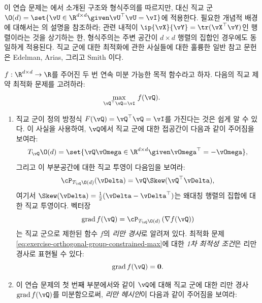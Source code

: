 \documentclass[../../book-main_ko.tex]{subfiles}
\begin{document}
\begin{exercise}\label{exercise:orthogonal-group-calculus}
    이 연습 문제는 에서 소개된 구조와 형식주의를 따르지만, 대신 직교 군 $\O(d) = \set{\vU \in \R^{d \times d} \given \vU^\top \vU = \vI}$에 적용한다. 필요한 개념적 배경에 대해서는 의 설명을 참조하라; 관련 내적이 $\ip{\vX}{\vY} = \tr(\vX^\top \vY)$인 행렬이라는 것을 상기하는 한, 형식주의는 주변 공간이 $d \times d$ 행렬의 집합인 경우에도 동일하게 적용된다. 직교 군에 대한 최적화에 관한 사실들에 대한 훌륭한 일반 참고 문헌은 Edelman, Arias, 그리고 Smith \cite{Edelman1998-lg}이다.

    $f : \R^{d\times d} \to \R$를 주어진 두 번 연속 미분 가능한 목적 함수라고 하자. 다음의 직교 제약 최적화 문제를 고려하라:
    \begin{equation}\label{eq:exercise-orthogonal-group-constrained-max}
        \max_{\vQ^\top \vQ = \vI}\, f(\vQ).
    \end{equation}
    \begin{enumerate}
        \item 직교 군이 정의 방정식 $F(\vQ) = \vQ^\top \vQ = \vI$를 가진다는 것은 쉽게 알 수 있다. 이 사실을 사용하여, $\vQ$에서 직교 군에 대한 접공간이 다음과 같이 주어짐을 보여라:
        \begin{equation*}
            T_{\vQ} \O(d) = \set{\vQ \vOmega \in \R^{d\times d} \given \vOmega^\top = - \vOmega},
        \end{equation*}
        그리고 이 부분공간에 대한 직교 투영이 다음임을 보여라:
        \begin{equation*}
        \cP_{T_{\vQ}\O(d)}(\vDelta) =  \vQ \Skew(\vQ^\top \vDelta),
        \end{equation*}
        여기서 $\Skew(\vDelta) = \tfrac{1}{2} ( \vDelta - \vDelta^\top)$는 왜대칭 행렬의 집합에 대한 직교 투영이다. 벡터장
        \begin{equation}\label{eq:exercise-riemann-grad-orthogonal-group}
        \mathrm{grad}\, f(\vQ) = \cP_{T_{\vQ} \O(d)} \left( \nabla f(\vQ) \right)
        \end{equation}
        는 직교 군으로 제한된 함수 $f$의 \textit{리만 경사}로 알려져 있다. 최적화 문제 \eqref{eq:exercise-orthogonal-group-constrained-max}에 대한 \textit{1차 최적성 조건}은 리만 경사로 표현될 수 있다:
        \begin{equation*}
            \mathrm{grad}\, f(\vQ) = \mathbf{0}.
        \end{equation*}
        \item 이 연습 문제의 첫 번째 부분에서와 같이 $\vQ$에 대해 직교 군에 대한 리만 경사 $\mathrm{grad}\, f(\vQ)$를 미분함으로써, \textit{리만 헤시안}이 다음과 같이 주어짐을 보여라:

\end{enumerate}
\end{exercise}
\end{document}
